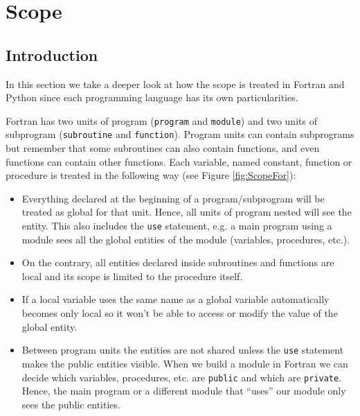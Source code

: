 \chapter{Scope} 

\section{Introduction}

In this section we take a deeper look at how the scope is treated in Fortran and Python since each programming language has its own particularities. 

Fortran has two units of program (\texttt{program} and \texttt{module}) and two units of subprogram (\texttt{subroutine} and \texttt{function}).
Program units can contain subprograms but remember that some subroutines can also contain functions, and even functions can contain other functions. 
Each variable, named constant, function or procedure is treated in the following way (see Figure \ref{fig:ScopeFor}):
\begin{itemize}
    \item Everything declared at the beginning of a program/subprogram will be treated as global for that unit. Hence, all units of program nested will see the entity.
    This also includes the \texttt{use} statement, e.g. a main program using a module sees all the global entities of the module (variables, procedures, etc.). 
    
    \item On the contrary, all entities declared inside subroutines and functions are local and its scope is limited to the procedure itself. 
    
    \item If a local variable uses the same name as a global variable automatically becomes only local so it won't be able to access or modify the value of the global entity. 
    
    \item Between program units the entities are not shared unless the \texttt{use} statement makes the public entities visible. 
    When we build a module in Fortran we can decide which variables, procedures, etc. are \texttt{public} and which are \texttt{private}. 
    Hence, the main program or a different module that ``uses'' our module only sees the public entities.
\end{itemize}

